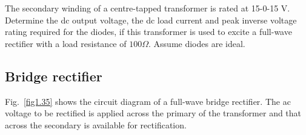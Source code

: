 \begin{problem}\label{prob1.13}
The secondary winding of a centre-tapped transformer is rated at 15-0-15 V. Determine the dc output voltage, the dc load current and peak inverse voltage rating required for the diodes, if this transformer is used to excite a full-wave rectifier with a load resistance of $100\Omega$. Assume diodes are ideal.
\end{problem}

\eject


\subsection{Bridge rectifier}\label{sec1.10.3}

Fig.~\ref{fig1.35} shows the circuit diagram of a full-wave bridge rectifier. The ac voltage to be rectified is applied across the primary of the transformer and that across the secondary is available for rectification.

